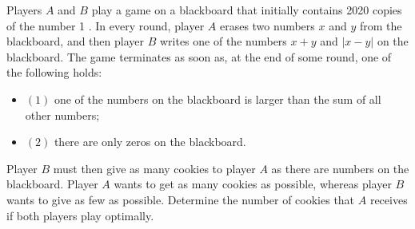 Players $A$ and $B$ play a game on a blackboard that initially contains 2020 copies of the number 1 . In every round, player $A$ erases two numbers $x$ and $y$ from the blackboard, and then player $B$ writes one of the numbers $x+y$ and $|x-y|$ on the blackboard. The game terminates as soon as, at the end of some round, one of the following holds:
\begin{itemize}
	\item $(1)$ one of the numbers on the blackboard is larger than the sum of all other numbers;
	\item $(2)$ there are only zeros on the blackboard.
\end{itemize}
Player $B$ must then give as many cookies to player $A$ as there are numbers on the blackboard. Player $A$ wants to get as many cookies as possible, whereas player $B$ wants to give as few as possible. Determine the number of cookies that $A$ receives if both players play optimally.